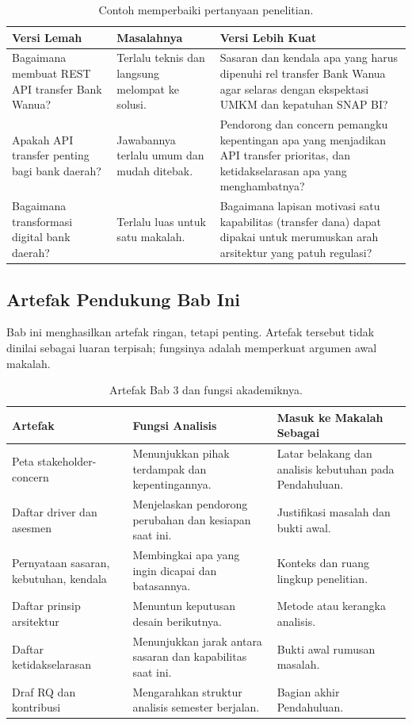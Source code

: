 \begin{table}[htbp]
\centering
\scriptsize
\caption{Contoh memperbaiki pertanyaan penelitian.}
\label{tab:rq-baik-buruk}
\begin{tabularx}{\textwidth}{@{}p{} X X@{}}
\hline
\textbf{Versi Lemah} & \textbf{Masalahnya} & \textbf{Versi Lebih Kuat} \\
\hline
Bagaimana membuat REST API transfer Bank Wanua? & Terlalu teknis dan langsung
melompat ke solusi. & Sasaran dan kendala apa yang harus dipenuhi rel transfer
Bank Wanua agar selaras dengan ekspektasi UMKM dan kepatuhan SNAP BI? \\
Apakah API transfer penting bagi bank daerah? & Jawabannya terlalu umum dan
mudah ditebak. & Pendorong dan concern pemangku kepentingan apa yang menjadikan
API transfer prioritas, dan ketidakselarasan apa yang menghambatnya? \\
Bagaimana transformasi digital bank daerah? & Terlalu luas untuk satu makalah.
& Bagaimana lapisan motivasi satu kapabilitas (transfer dana) dapat dipakai
untuk merumuskan arah arsitektur yang patuh regulasi? \\
\hline
\end{tabularx}
\end{table}

\subsection*{Artefak Pendukung Bab Ini}

Bab ini menghasilkan artefak ringan, tetapi penting. Artefak tersebut tidak
dinilai sebagai luaran terpisah; fungsinya adalah memperkuat argumen awal
makalah.

\begin{table}[htbp]
\centering
\scriptsize
\caption{Artefak Bab 3 dan fungsi akademiknya.}
\label{tab:artefak-bab2}
\begin{tabularx}{\textwidth}{@{}p{} X X@{}}
\hline
\textbf{Artefak} & \textbf{Fungsi Analisis} & \textbf{Masuk ke Makalah Sebagai} \\
\hline
Peta stakeholder-concern & Menunjukkan pihak terdampak dan kepentingannya. &
Latar belakang dan analisis kebutuhan pada Pendahuluan. \\
Daftar driver dan asesmen & Menjelaskan pendorong perubahan dan kesiapan saat
ini. & Justifikasi masalah dan bukti awal. \\
Pernyataan sasaran, kebutuhan, kendala & Membingkai apa yang ingin dicapai dan
batasannya. & Konteks dan ruang lingkup penelitian. \\
Daftar prinsip arsitektur & Menuntun keputusan desain berikutnya. & Metode atau
kerangka analisis. \\
Daftar ketidakselarasan & Menunjukkan jarak antara sasaran dan kapabilitas
saat ini. & Bukti awal rumusan masalah. \\
Draf RQ dan kontribusi & Mengarahkan struktur analisis semester berjalan. &
Bagian akhir Pendahuluan. \\
\hline
\end{tabularx}
\end{table}


